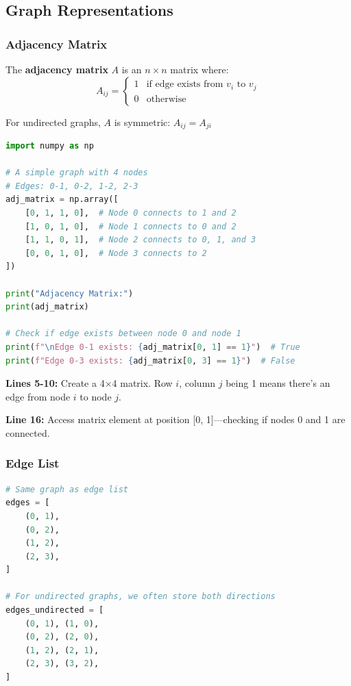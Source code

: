 \documentclass[12pt,a4paper]{article}
\begin{document}
\subsection{Graph Representations}

\subsubsection{Adjacency Matrix}

\begin{mathbox}
The \textbf{adjacency matrix} $A$ is an $n \times n$ matrix where:
\[
A_{ij} = \begin{cases}
1 & \text{if edge exists from } v_i \text{ to } v_j \\
0 & \text{otherwise}
\end{cases}
\]

For undirected graphs, $A$ is symmetric: $A_{ij} = A_{ji}$
\end{mathbox}

\begin{lstlisting}[language=Python,caption={Adjacency matrix representation}]
import numpy as np

# A simple graph with 4 nodes
# Edges: 0-1, 0-2, 1-2, 2-3
adj_matrix = np.array([
    [0, 1, 1, 0],  # Node 0 connects to 1 and 2
    [1, 0, 1, 0],  # Node 1 connects to 0 and 2
    [1, 1, 0, 1],  # Node 2 connects to 0, 1, and 3
    [0, 0, 1, 0],  # Node 3 connects to 2
])

print("Adjacency Matrix:")
print(adj_matrix)

# Check if edge exists between node 0 and node 1
print(f"\nEdge 0-1 exists: {adj_matrix[0, 1] == 1}")  # True
print(f"Edge 0-3 exists: {adj_matrix[0, 3] == 1}")  # False
\end{lstlisting}

\begin{explanation}
\textbf{Lines 5-10:} Create a 4$\times$4 matrix. Row $i$, column $j$ being 1 means there's an edge from node $i$ to node $j$.

\textbf{Line 16:} Access matrix element at position [0, 1]---checking if nodes 0 and 1 are connected.
\end{explanation}

\subsubsection{Edge List}

\begin{lstlisting}[language=Python,caption={Edge list representation}]
# Same graph as edge list
edges = [
    (0, 1),
    (0, 2),
    (1, 2),
    (2, 3),
]

# For undirected graphs, we often store both directions
edges_undirected = [
    (0, 1), (1, 0),
    (0, 2), (2, 0),
    (1, 2), (2, 1),
    (2, 3), (3, 2),
]
\end{lstlisting}
\end{document}
